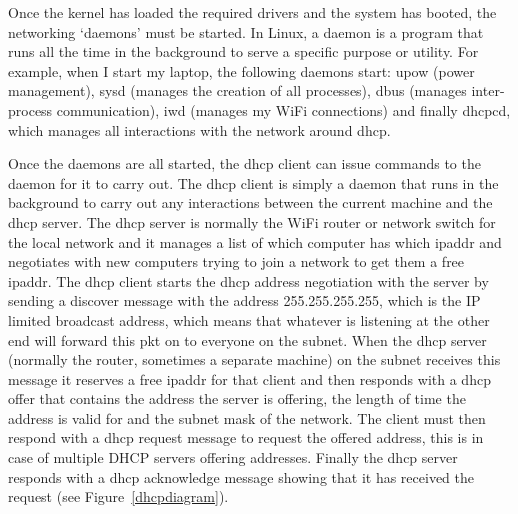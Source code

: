 \documentclass[titlepage]{article}
\begin{document}
Once the \gls{kernel} has loaded the required \glspl{driver} and the system has booted, the 
networking `\glspl{daemon}' must be started. In Linux, a \gls{daemon} is a program that runs all the 
time in the background to serve a specific purpose or utility. For example, when I start my laptop,
the following \glspl{daemon} start: \gls{upow} (power management), \gls{sysd} (manages the creation 
of all processes), \gls{dbus} (manages inter-process communication), iwd (manages my WiFi 
connections) and finally \gls{dhcpcd}, which manages all interactions with the network around 
\gls{dhcp}.

Once the \glspl{daemon} are all started, the \gls{dhcp} client can issue commands to the 
daemon for it to carry out. The \gls{dhcp} client is simply a daemon that runs in the background to 
carry out any interactions between the current machine and the \gls{dhcp} server. The \gls{dhcp} 
server is normally the WiFi router or network switch for the local network and it manages a list of 
which computer has which \gls{ipaddr} and negotiates with new computers trying to join a network to 
get them a free \gls{ipaddr}. The \gls{dhcp} client starts the \gls{dhcp} address negotiation with 
the server by sending a discover message with the address 255.255.255.255, which is the IP limited 
broadcast address, which means that whatever is listening at the other end will forward this 
\gls{pkt} on to everyone on the \gls{subnet}. When the \gls{dhcp} \gls{server} (normally the router, 
sometimes a separate machine) on the subnet receives this message it reserves a free \gls{ipaddr} 
for that client and then responds with a \gls{dhcp} offer that contains the address the 
\gls{server} is offering, the length of time the address is valid for and the \gls{subnet} mask of 
the network. The client must then respond with a \gls{dhcp} request message to request the offered 
address, this is in case of multiple DHCP servers offering addresses. Finally the \gls{dhcp} server 
responds with a \gls{dhcp} acknowledge message showing that it has received the request
(see Figure~\ref{dhcpdiagram}).
\end{document}
